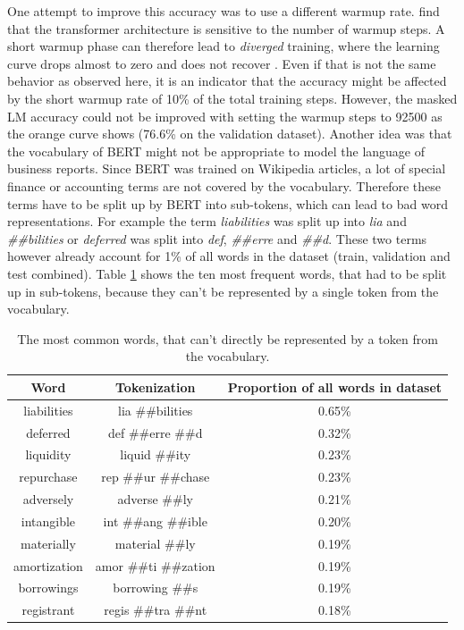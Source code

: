 One attempt to improve this accuracy was to use a different warmup rate.
\cite{Popel2018} find that the transformer architecture is sensitive to the number of warmup steps.
A short warmup phase can therefore lead to \textit{diverged} training, where the learning curve drops almost to zero and does not recover \cite[p. 60]{Popel2018}.
Even if that is not the same behavior as observed here, it is an indicator that the accuracy might be affected by the short warmup rate of 10\% of the total training steps.
However, the masked LM accuracy could not be improved with setting the warmup steps to 92500 as the orange curve shows (76.6\% on the validation dataset).
Another idea was that the vocabulary of \ac{BERT} might not be appropriate to model the language of business reports.
Since BERT was trained on Wikipedia articles, a lot of special finance or accounting terms are not covered by the vocabulary.
Therefore these terms have to be split up by \ac{BERT} into sub-tokens, which can lead to bad word representations.
For example the term \textit{liabilities} was split up into \textit{lia} and \textit{\#\#bilities} or \textit{deferred} was split into \textit{def}, \textit{\#\#erre} and \textit{\#\#d}.
These two terms however already account for 1\% of all words in the dataset (train, validation and test combined).
Table \ref{table:not_in_vocab_words} shows the ten most frequent words, that had to be split up in sub-tokens, because they can't be represented by a single token from the vocabulary.
\begin{table}[h]
    \centering
    \begin{tabular}{ c  c  c }
        Word & Tokenization & Proportion of all words in dataset \\ \hline
        liabilities & lia \#\#bilities & 0.65\% \\
        deferred & def \#\#erre \#\#d & 0.32\% \\
        liquidity & liquid \#\#ity & 0.23\% \\
        repurchase & rep \#\#ur \#\#chase & 0.23\% \\
        adversely & adverse \#\#ly & 0.21\% \\
        intangible & int \#\#ang \#\#ible & 0.20\% \\
        materially & material \#\#ly & 0.19\% \\
        amortization & amor \#\#ti \#\#zation & 0.19\% \\
        borrowings & borrowing \#\#s & 0.19\% \\
        registrant & regis \#\#tra \#\#nt & 0.18\% \\
    \end{tabular}
    \caption{The most common words, that can't directly be represented by a token from the vocabulary.}
    \label{table:not_in_vocab_words}
\end{table}
